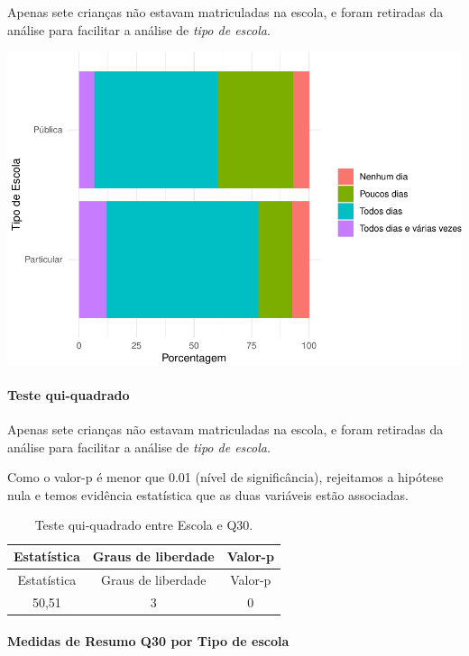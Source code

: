 \documentclass[]{article}
\let\oldparagraph\paragraph
\renewcommand{\paragraph}[1]{\oldparagraph{#1}\mbox{}}
\begin{document}
Apenas sete crianças não estavam matriculadas na escola, e foram retiradas da análise para facilitar a análise de \emph{tipo de escola}.

\begin{center}\includegraphics[width=0.75\linewidth]{relatorio_covid19_files/figure-latex/unnamed-chunk-997-1} \end{center}

\hypertarget{teste-qui-quadrado-86}{%
\paragraph{Teste qui-quadrado}\label{teste-qui-quadrado-86}}

Apenas sete crianças não estavam matriculadas na escola, e foram retiradas da análise para facilitar a análise de \emph{tipo de escola}.

Como o valor-p é menor que 0.01 (nível de significância), rejeitamos a hipótese nula e temos evidência estatística que as duas variáveis estão associadas.

\begin{longtable}[]{@{}ccc@{}}
\caption{\label{tab:unnamed-chunk-999}Teste qui-quadrado entre Escola e Q30.}\tabularnewline
\toprule
Estatística & Graus de liberdade & Valor-p\tabularnewline
\midrule
\endfirsthead
\toprule
Estatística & Graus de liberdade & Valor-p\tabularnewline
\midrule
\endhead
50,51 & 3 & 0\tabularnewline
\bottomrule
\end{longtable}

\cleardoublepage

\hypertarget{medidas-de-resumo-q30-por-tipo-de-escola}{%
\paragraph{Medidas de Resumo Q30 por Tipo de escola}\label{medidas-de-resumo-q30-por-tipo-de-escola}}
\end{document}
